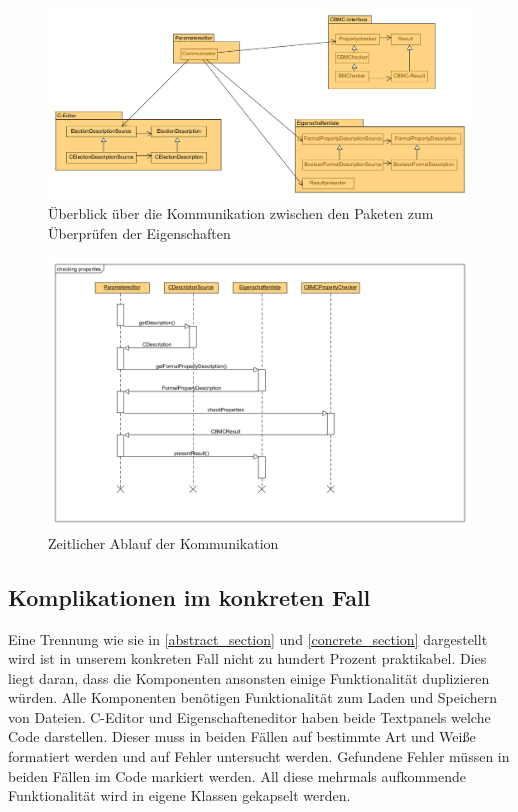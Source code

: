 \documentclass[a4paper]{scrreprt}
\begin{document}
\begin{figure}[H]
\includegraphics[scale=0.4]{high-level-communication.png}
\caption{Überblick über die Kommunikation zwischen den Paketen zum Überprüfen der Eigenschaften}
\label{view_of_communication_checking_formal_props}
\end{figure}

\begin{figure}[H]
\includegraphics[scale=0.35]{high-level-communication-activity.png}
\caption{Zeitlicher Ablauf der Kommunikation}
\label{view_of_communication_checking_formal_props_activity_diagram}
\end{figure}

\subsection{Komplikationen im konkreten Fall}
Eine Trennung wie sie in \ref{abstract_section} und \ref{concrete_section} dargestellt wird ist in unserem konkreten Fall nicht zu hundert Prozent praktikabel. Dies liegt daran, dass die Komponenten ansonsten einige Funktionalität duplizieren würden. Alle Komponenten benötigen Funktionalität zum Laden und Speichern von Dateien. C-Editor und Eigenschafteneditor haben beide Textpanels welche Code darstellen. Dieser muss in beiden Fällen auf bestimmte Art und Weiße formatiert werden und auf Fehler untersucht werden. Gefundene Fehler müssen in beiden Fällen im Code markiert werden. All diese mehrmals aufkommende Funktionalität wird in eigene Klassen gekapselt werden.
\end{document}
